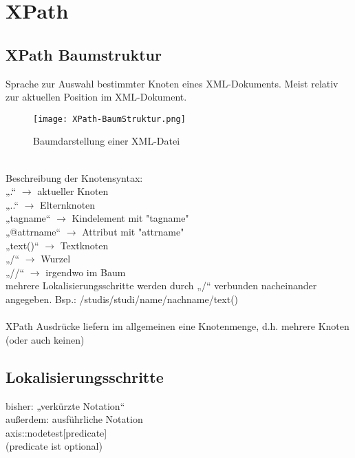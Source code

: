 \chapter{XPath}

\section{XPath Baumstruktur}
Sprache zur Auswahl bestimmter Knoten eines XML-Dokuments. Meist relativ zur aktuellen Position im XML-Dokument.\\
\begin{figure}[htbp]
  \texttt{[image: XPath-BaumStruktur.png]}
  \caption{Baumdarstellung einer XML-Datei}
\end{figure}\\
Beschreibung der Knotensyntax:\\
„.“ $\rightarrow$ aktueller Knoten\\
„..“ $\rightarrow$ Elternknoten\\
„tagname“ $\rightarrow$ Kindelement mit "tagname"\\
„@attrname“ $\rightarrow$ Attribut mit "attrname"\\
„text()“ $\rightarrow$ Textknoten\\
„/“ $\rightarrow$ Wurzel\\
„//“ $\rightarrow$ irgendwo im Baum\\
mehrere Lokalisierungsschritte werden durch „/“ verbunden nacheinander angegeben. Bsp.: /studis/studi/name/nachname/text()\\
\\
XPath Ausdrücke liefern im allgemeinen eine Knotenmenge, d.h. mehrere Knoten (oder auch keinen)

\section{Lokalisierungsschritte}
bisher: „verkürzte Notation“\\
außerdem: ausführliche Notation\\
axis::nodetest[predicate]\\
(predicate ist optional)\\

